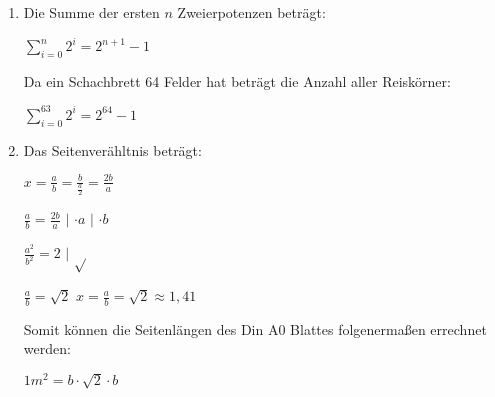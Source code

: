 \documentclass[../main.tex]{subfiles}
\begin{document}
\begin{enumerate}
	\item Die Summe der ersten
	      \begin{math}
		      n
	      \end{math}
	      Zweierpotenzen beträgt:

	      \begin{math}
		      \sum_{i=0}^{n} 2^i = 2^{n+1} - 1
	      \end{math}

	      Da ein Schachbrett 64 Felder hat beträgt die Anzahl aller Reiskörner:

	      \begin{math}
		      \sum_{i=0}^{63} 2^i = 2^{64} - 1
	      \end{math}
	\item Das Seitenverähltnis beträgt:

	      \begin{math}
		      x = \frac{a}{b} = \frac{b}{
			      \frac{a}{2}
		      }
		      = \frac{2b}{a}
	      \end{math}

	      \begin{math}
		      \frac{a}{b} = \frac{2b}{a}
	      \end{math}
	      $|$
	      \begin{math}
		      \cdot a
	      \end{math}
	      $|$
	      \begin{math}
		      \cdot b
	      \end{math}

	      \begin{math}
		      \frac{a^2}{b^2} = 2
	      \end{math}
	      $|$
	      \begin{math}
		      \sqrt{}
	      \end{math}

	      \begin{math}
		      \frac{a}{b} = \sqrt{2}
	      \end{math}
	      \begin{math}
		      x = \frac{a}{b}
		      = \sqrt{2}
		      \approx 1,41
	      \end{math}

	      Somit können die Seitenlängen des Din A0 Blattes folgenermaßen
	      errechnet werden:

	      \begin{math}
		      1 m^2 = b \cdot \sqrt{2} \cdot b
	      \end{math}


\end{enumerate}
\end{document}
